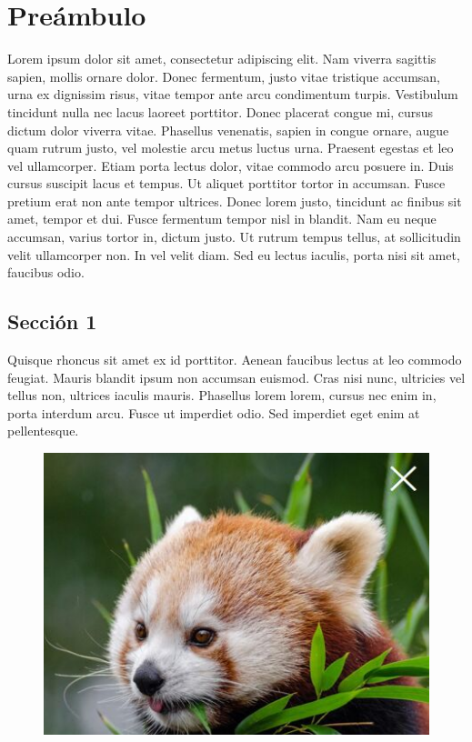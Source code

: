 \chapter{Preámbulo}

Lorem ipsum dolor sit amet, consectetur adipiscing elit. Nam viverra sagittis sapien, mollis ornare dolor. Donec fermentum, justo vitae tristique accumsan, urna ex dignissim risus, vitae tempor ante arcu condimentum turpis. Vestibulum tincidunt nulla nec lacus laoreet porttitor. Donec placerat congue mi, cursus dictum dolor viverra vitae. Phasellus venenatis, sapien in congue ornare, augue quam rutrum justo, vel molestie arcu metus luctus urna. Praesent egestas et leo vel ullamcorper. Etiam porta lectus dolor, vitae commodo arcu posuere in. Duis cursus suscipit lacus et tempus. Ut aliquet porttitor tortor in accumsan. Fusce pretium erat non ante tempor ultrices. Donec lorem justo, tincidunt ac finibus sit amet, tempor et dui. Fusce fermentum tempor nisl in blandit. Nam eu neque accumsan, varius tortor in, dictum justo. Ut rutrum tempus tellus, at sollicitudin velit ullamcorper non. In vel velit diam. Sed eu lectus iaculis, porta nisi sit amet, faucibus odio.

	\section{Sección 1}
	
	Quisque rhoncus sit amet ex id porttitor. Aenean faucibus lectus at leo commodo feugiat. Mauris blandit ipsum non accumsan euismod. Cras nisi nunc, ultricies vel tellus non, ultrices iaculis mauris. Phasellus lorem lorem, cursus nec enim in, porta interdum arcu. Fusce ut imperdiet odio. Sed imperdiet eget enim at pellentesque.
	
	\begin{figure}[H]
		\begin{center}
			\includegraphics[width = 0.8\GlLineWidth]{rsc/img/TestImage}
		\end{center} 
	\end{figure}
	
